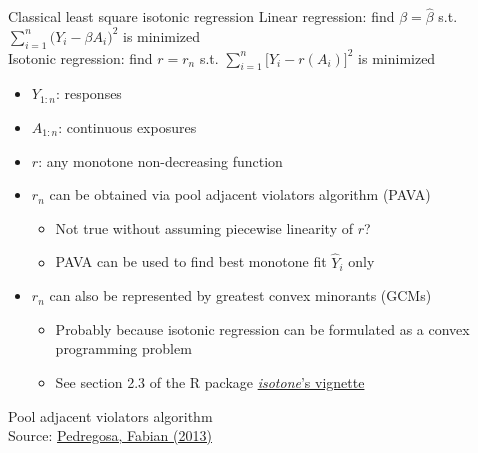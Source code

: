 \documentclass{beamer}
\newcommand{\sn}{\sum_{i=1}^n}
\newcommand{\fn}[1]{{\footnotesize #1}}
\begin{document}
\begin{frame}{Classical least square isotonic regression}
  Linear regression: find $\beta=\hat{\beta}$ s.t. $\sn \big( Y_i -\beta A_i \big)^2$ is minimized \\
  Isotonic regression: find $r=r_n$ s.t. $\sn \big[ Y_i -r(A_i) \big]^2$ is minimized
  \begin{itemize}
    \item $Y_{1:n}$: responses
    \item $A_{1:n}$: continuous exposures
    \item $r$: any monotone non-decreasing function
    \item $r_n$ can be obtained via pool adjacent violators algorithm (PAVA)
    \begin{itemize}
      \item Not true without assuming piecewise linearity of $r$?
      \item PAVA can be used to find best monotone fit $\hat{Y}_i$ only
    \end{itemize}
    \item $r_n$ can also be represented by greatest convex minorants (GCMs)
    \begin{itemize}
      \item Probably because isotonic regression can be formulated as a convex programming problem
      \item See section 2.3 of the R package \href{https://cran.r-project.org/web/packages/isotone/vignettes/isotone.pdf}{\textit{isotone}'s vignette}
    \end{itemize}
  \end{itemize}
\end{frame}

\begin{frame}{Pool adjacent violators algorithm}
   \\
  \fn{Source: \href{http://fa.bianp.net/blog/2013/isotonic-regression/}{Pedregosa, Fabian (2013)}}
\end{frame}
\end{document}
